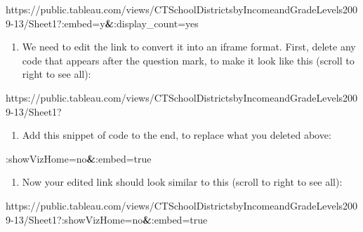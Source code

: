 \documentclass[
  english,
]{book}
\newenvironment{Shaded}{\begin{snugshade}}{\end{snugshade}}
\newcommand{\ErrorTok}[1]{\textcolor[rgb]{0.64,0.00,0.00}{\textbf{#1}}}
\newcommand{\NormalTok}[1]{#1}
\providecommand{\tightlist}{%
  \setlength{\itemsep}{0pt}\setlength{\parskip}{0pt}}
\begin{document}
\begin{Shaded}
\begin{Highlighting}[]
\NormalTok{https://public.tableau.com/views/CTSchoolDistrictsbyIncomeandGradeLevels2009{-}13/Sheet1?:embed=y}\ErrorTok{\&}\NormalTok{:display\_count=yes}
\end{Highlighting}
\end{Shaded}

\begin{enumerate}
\def\labelenumi{\arabic{enumi})}
\setcounter{enumi}{5}
\tightlist
\item
  We need to edit the link to convert it into an iframe format. First, delete any code that appears after the question mark, to make it look like this (scroll to right to see all):
\end{enumerate}

\begin{Shaded}
\begin{Highlighting}[]
\NormalTok{https://public.tableau.com/views/CTSchoolDistrictsbyIncomeandGradeLevels2009{-}13/Sheet1?}
\end{Highlighting}
\end{Shaded}

\begin{enumerate}
\def\labelenumi{\arabic{enumi})}
\setcounter{enumi}{6}
\tightlist
\item
  Add this snippet of code to the end, to replace what you deleted above:
\end{enumerate}

\begin{Shaded}
\begin{Highlighting}[]
\NormalTok{:showVizHome=no}\ErrorTok{\&}\NormalTok{:embed=true}
\end{Highlighting}
\end{Shaded}

\begin{enumerate}
\def\labelenumi{\arabic{enumi})}
\setcounter{enumi}{7}
\tightlist
\item
  Now your edited link should look similar to this (scroll to right to see all):
\end{enumerate}

\begin{Shaded}
\begin{Highlighting}[]
\NormalTok{https://public.tableau.com/views/CTSchoolDistrictsbyIncomeandGradeLevels2009{-}13/Sheet1?:showVizHome=no}\ErrorTok{\&}\NormalTok{:embed=true}
\end{Highlighting}
\end{Shaded}
\end{document}

